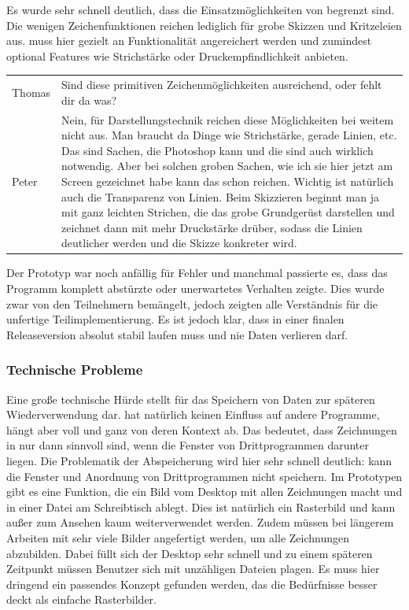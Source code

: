 \medskip Es wurde sehr schnell deutlich, dass die Einsatzmöglichkeiten von \scribbler begrenzt sind. Die wenigen Zeichenfunktionen reichen lediglich für grobe Skizzen und Kritzeleien aus. \scribbler muss hier gezielt an Funktionalität angereichert werden und zumindest optional Features wie Strichstärke oder Druckempfindlichkeit anbieten.

\begin{extract}[Die Einsatzmöglichkeiten sind begrenzt.]
	{
		\myfloatalign
		\begin{tabularx}{\textwidth}{p{1.5cm}X}
			Thomas & Sind diese primitiven Zeichenmöglichkeiten ausreichend, oder fehlt dir da was?\\
			Peter & Nein, für Darstellungstechnik reichen diese Möglichkeiten bei weitem nicht aus. Man braucht da Dinge wie Strichstärke, gerade Linien, etc. Das sind Sachen, die Photoshop kann und die sind auch wirklich notwendig. Aber bei solchen groben Sachen, wie ich sie hier jetzt am Screen gezeichnet habe kann das schon reichen. Wichtig ist natürlich auch die Transparenz von Linien. Beim Skizzieren beginnt man ja mit ganz leichten Strichen, die das grobe Grundgerüst darstellen und zeichnet dann mit mehr Druckstärke drüber, sodass die Linien deutlicher werden und die Skizze konkreter wird.
		\end{tabularx}
	}
\end{extract}

Der Prototyp war noch anfällig für Fehler und manchmal passierte es, dass das Programm komplett abstürzte oder unerwartetes Verhalten zeigte. Dies wurde zwar von den Teilnehmern bemängelt, jedoch zeigten alle Verständnis für die unfertige Teilimplementierung. Es ist jedoch klar, dass \scribbler in einer finalen Releaseversion absolut stabil laufen muss und nie Daten verlieren darf.


\subsubsection{Technische Probleme}
Eine große technische Hürde stellt für \scribbler das Speichern von Daten zur späteren Wiederverwendung dar. \scribbler hat natürlich keinen Einfluss auf andere Programme, hängt aber voll und ganz von deren Kontext ab. Das bedeutet, dass Zeichnungen in \scribbler nur dann sinnvoll sind, wenn die Fenster von Drittprogrammen darunter liegen. Die Problematik der Abspeicherung wird hier sehr schnell deutlich: \scribbler kann die Fenster und Anordnung von Drittprogrammen nicht speichern. Im Prototypen gibt es eine Funktion, die ein Bild vom Desktop mit allen Zeichnungen macht und in einer Datei am Schreibtisch ablegt. Dies ist natürlich ein Rasterbild und kann außer zum Ansehen kaum weiterverwendet werden. Zudem müssen bei längerem Arbeiten mit \scribbler sehr viele Bilder angefertigt werden, um alle Zeichnungen abzubilden. Dabei füllt sich der Desktop sehr schnell und zu einem späteren Zeitpunkt müssen Benutzer sich mit unzähligen Dateien plagen. Es muss hier dringend ein passendes Konzept gefunden werden, das die Bedürfnisse besser deckt als einfache Rasterbilder. 

